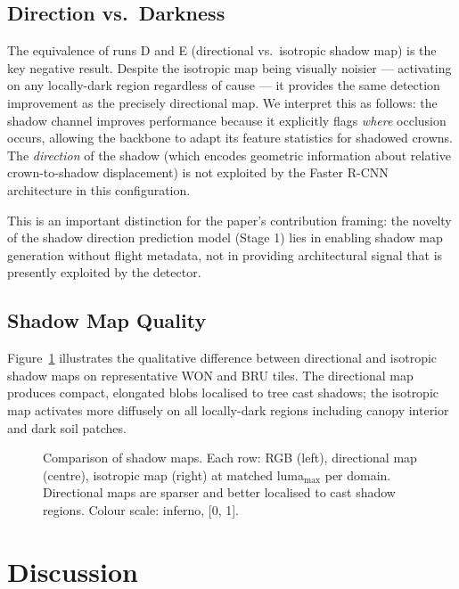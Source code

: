 \documentclass[10pt,twocolumn]{article}
\begin{document}
\subsection{Direction vs.\ Darkness}

The equivalence of runs D and E (directional vs.\ isotropic shadow map) is the
key negative result. Despite the isotropic map being visually noisier ---
activating on any locally-dark region regardless of cause --- it provides the
same detection improvement as the precisely directional map. We interpret this
as follows: the shadow channel improves performance because it explicitly flags
\emph{where} occlusion occurs, allowing the backbone to adapt its feature
statistics for shadowed crowns. The \emph{direction} of the shadow (which
encodes geometric information about relative crown-to-shadow displacement) is
not exploited by the Faster R-CNN architecture in this configuration.

This is an important distinction for the paper's contribution framing: the
novelty of the shadow direction prediction model (Stage 1) lies in enabling
shadow map generation without flight metadata, not in providing architectural
signal that is presently exploited by the detector.

\subsection{Shadow Map Quality}

Figure~\ref{fig:shadow_maps} illustrates the qualitative difference between
directional and isotropic shadow maps on representative WON and BRU tiles.
The directional map produces compact, elongated blobs localised to tree cast
shadows; the isotropic map activates more diffusely on all locally-dark
regions including canopy interior and dark soil patches.

\begin{figure}[t]
  \centering
  \fbox{\rule{0pt}{5cm}\rule{\linewidth}{0pt}}
  \caption{Comparison of shadow maps. Each row: RGB (left), directional map
           (centre), isotropic map (right) at matched luma$_{\max}$ per
           domain. Directional maps are sparser and better localised to
           cast shadow regions. Colour scale: inferno, [0, 1].}
  \label{fig:shadow_maps}
\end{figure}

\section{Discussion}
\end{document}

